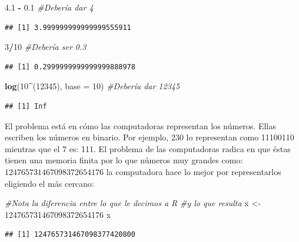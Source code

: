 \documentclass[
]{book}
\newenvironment{Shaded}{\begin{snugshade}}{\end{snugshade}}
\newcommand{\CommentTok}[1]{\textcolor[rgb]{0.56,0.35,0.01}{\textit{#1}}}
\newcommand{\DataTypeTok}[1]{\textcolor[rgb]{0.13,0.29,0.53}{#1}}
\newcommand{\DecValTok}[1]{\textcolor[rgb]{0.00,0.00,0.81}{#1}}
\newcommand{\FloatTok}[1]{\textcolor[rgb]{0.00,0.00,0.81}{#1}}
\newcommand{\KeywordTok}[1]{\textcolor[rgb]{0.13,0.29,0.53}{\textbf{#1}}}
\newcommand{\NormalTok}[1]{#1}
\newcommand{\OperatorTok}[1]{\textcolor[rgb]{0.81,0.36,0.00}{\textbf{#1}}}
\newcommand{\StringTok}[1]{\textcolor[rgb]{0.31,0.60,0.02}{#1}}
\begin{document}
\begin{Shaded}
\begin{Highlighting}[]
\FloatTok{4.1} \OperatorTok{-}\StringTok{ }\FloatTok{0.1} \CommentTok{#Debería dar 4}
\end{Highlighting}
\end{Shaded}

\begin{verbatim}
## [1] 3.999999999999999555911
\end{verbatim}

\begin{Shaded}
\begin{Highlighting}[]
\DecValTok{3}\OperatorTok{/}\DecValTok{10}      \CommentTok{#Debería ser 0.3}
\end{Highlighting}
\end{Shaded}

\begin{verbatim}
## [1] 0.2999999999999999888978
\end{verbatim}

\begin{Shaded}
\begin{Highlighting}[]
\KeywordTok{log}\NormalTok{(}\DecValTok{10}\OperatorTok{^}\NormalTok{(}\DecValTok{12345}\NormalTok{), }\DataTypeTok{base =} \DecValTok{10}\NormalTok{) }\CommentTok{#Debería dar 12345}
\end{Highlighting}
\end{Shaded}

\begin{verbatim}
## [1] Inf
\end{verbatim}

El problema está en cómo las computadoras representan los números. Ellas escriben los números en binario. Por ejemplo, 230 lo representan como 11100110 mientras que el 7 es: 111. El problema de las computadoras radica en que éstas tienen una memoria finita por lo que números muy grandes como: \(124765731467098372654176\) la computadora hace lo mejor por representarlos eligiendo el más cercano:

\begin{Shaded}
\begin{Highlighting}[]
\CommentTok{#Nota la diferencia entre lo que le decimos a R}
\CommentTok{#y lo que resulta}
\NormalTok{x <-}\StringTok{ }\DecValTok{124765731467098372654176}
\NormalTok{x}
\end{Highlighting}
\end{Shaded}

\begin{verbatim}
## [1] 124765731467098377420800
\end{verbatim}
\end{document}
